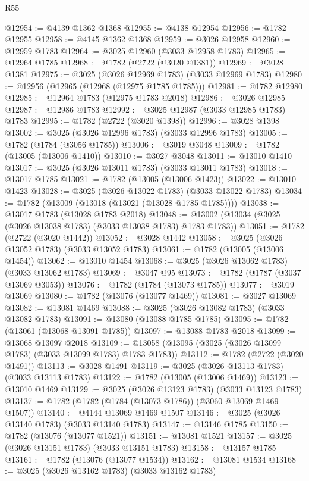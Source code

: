\begin{lexlean}{R55}
\begin{coremodule}
@12954 := @4139 @1362 @1368
@12955 := @4138 @12954
@12956 := @1782 @12955
@12958 := @4145 @1362 @1368
@12959 := @3026 @12958
@12960 := @12959 @1783
@12964 := @3025 @12960 (@3033 @12958 @1783)
@12965 := @12964 @1785
@12968 := @1782 (@2722 (@3020 @1381))
@12969 := @3028 @1381
@12975 := @3025 (@3026 @12969 @1783) (@3033 @12969 @1783)
@12980 := @12956 (@12965 (@12968 (@12975 @1785 @1785)))
@12981 := @1782 @12980
@12985 := @12964 @1783 (@12975 @1783 @2018)
@12986 := @3026 @12985
@12987 := @12986 @1783
@12992 := @3025 @12987 (@3033 @12985 @1783) @1783
@12995 := @1782 (@2722 (@3020 @1398))
@12996 := @3028 @1398
@13002 := @3025 (@3026 @12996 @1783) (@3033 @12996 @1783)
@13005 := @1782 (@1784 (@3056 @1785))
@13006 := @3019 @3048
@13009 := @1782 (@13005 (@13006 @1410))
@13010 := @3027 @3048
@13011 := @13010 @1410
@13017 := @3025 (@3026 @13011 @1783) (@3033 @13011 @1783)
@13018 := @13017 @1785
@13021 := @1782 (@13005 (@13006 @1423))
@13022 := @13010 @1423
@13028 := @3025 (@3026 @13022 @1783) (@3033 @13022 @1783)
@13034 := @1782 (@13009 (@13018 (@13021 (@13028 @1785 @1785))))
@13038 := @13017 @1783 (@13028 @1783 @2018)
@13048 := @13002 (@13034 (@3025 (@3026 @13038 @1783) (@3033 @13038 @1783) @1783 @1783))
@13051 := @1782 (@2722 (@3020 @1442))
@13052 := @3028 @1442
@13058 := @3025 (@3026 @13052 @1783) (@3033 @13052 @1783)
@13061 := @1782 (@13005 (@13006 @1454))
@13062 := @13010 @1454
@13068 := @3025 (@3026 @13062 @1783) (@3033 @13062 @1783)
@13069 := @3047 @95
@13073 := @1782 (@1787 (@3037 @13069 @3053))
@13076 := @1782 (@1784 (@13073 @1785))
@13077 := @3019 @13069
@13080 := @1782 (@13076 (@13077 @1469))
@13081 := @3027 @13069
@13082 := @13081 @1469
@13088 := @3025 (@3026 @13082 @1783) (@3033 @13082 @1783)
@13091 := @13080 (@13088 @1785 @1785)
@13095 := @1782 (@13061 (@13068 @13091 @1785))
@13097 := @13088 @1783 @2018
@13099 := @13068 @13097 @2018
@13109 := @13058 (@13095 (@3025 (@3026 @13099 @1783) (@3033 @13099 @1783) @1783 @1783))
@13112 := @1782 (@2722 (@3020 @1491))
@13113 := @3028 @1491
@13119 := @3025 (@3026 @13113 @1783) (@3033 @13113 @1783)
@13122 := @1782 (@13005 (@13006 @1469))
@13123 := @13010 @1469
@13129 := @3025 (@3026 @13123 @1783) (@3033 @13123 @1783)
@13137 := @1782 (@1782 (@1784 (@13073 @1786)) (@3060 @13069 @1469 @1507))
@13140 := @4144 @13069 @1469 @1507
@13146 := @3025 (@3026 @13140 @1783) (@3033 @13140 @1783)
@13147 := @13146 @1785
@13150 := @1782 (@13076 (@13077 @1521))
@13151 := @13081 @1521
@13157 := @3025 (@3026 @13151 @1783) (@3033 @13151 @1783)
@13158 := @13157 @1785
@13161 := @1782 (@13076 (@13077 @1534))
@13162 := @13081 @1534
@13168 := @3025 (@3026 @13162 @1783) (@3033 @13162 @1783)

\end{coremodule}
\end{lexlean}
